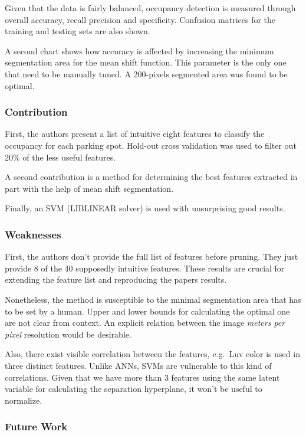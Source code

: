 \documentclass[]{article}
\begin{document}
Given that the data is fairly balanced, occupancy detection is measured through overall accuracy, recall precision and specificity. Confusion matrices for the training and testing sets are also shown.

A second chart shows how accuracy is affected by increasing the minimum segmentation area for the mean shift function. This parameter is the only one that need to be manually tuned. A 200-pixels segmented area was found to be optimal.

\hypertarget{contribution}{%
\subsubsection{Contribution}\label{contribution}}

First, the authors present a list of intuitive eight features to classify the occupancy for each parking spot. Hold-out cross validation was used to filter out 20\% of the less useful features.

A second contribution is a method for determining the best features extracted in part with the help of mean shift segmentation.

Finally, an SVM (LIBLINEAR solver) is used with unsurprising good results.

\hypertarget{weaknesses}{%
\subsubsection{Weaknesses}\label{weaknesses}}

First, the authors don't provide the full list of features before pruning. They just provide 8 of the 40 supposedly intuitive features. These results are crucial for extending the feature list and reproducing the papers results.

Nonetheless, the method is susceptible to the minimal segmentation area that has to be set by a human. Upper and lower bounds for calculating the optimal one are not clear from context. An explicit relation between the image \emph{meters per pixel} resolution would be desirable.

Also, there exist visible correlation between the features, e.g.~Luv color is used in three distinct features. Unlike ANNs, SVMs are vulnerable to this kind of correlations. Given that we have more than 3 features using the same latent variable for calculating the separation hyperplane, it won't be useful to normalize.

\hypertarget{future-work}{%
\subsubsection{Future Work}\label{future-work}}
\end{document}
